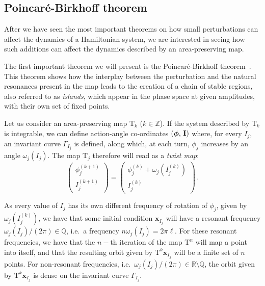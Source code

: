 \subsection{Poincaré-Birkhoff theorem}

After we have seen the most important theorems on how small perturbations can affect the dynamics of a Hamiltonian system, we are interested in seeing how such additions can affect the dynamics described by an area-preserving map.

The first important theorem we will present is the Poincaré-Birkhoff theorem~\cite{poincare, birkhoff}. This theorem shows how the interplay between the perturbation and the natural resonances present in the map leads to the creation of a chain of stable regions, also referred to as \textit{islands}, which appear in the phase space at given amplitudes, with their own set of fixed points.

Let us consider an area-preserving map $\mathrm{T}_k$ ($k\in\mathbb{Z}$). If the system described by $\mathrm{T}_k$ is integrable, we can define action-angle co-ordinates $(\boldsymbol{\phi},\,\vb{I})$ where, for every $I_j$, an invariant curve $\Gamma_{I_j}$ is defined, along which, at each turn, $\phi_j$ increases by an angle $\omega_j(I_j)$. The map $\mathrm{T}_j$ therefore will read as a \textit{twist map}:
%
\begingroup
\renewcommand*{\arraystretch}{1.5}
\begin{equation}
	\begin{pmatrix} {\phi}^{(k+1)}_j \\ {I}^{(k+1)}_j \end{pmatrix}  = \begin{pmatrix} {\phi}^{(k)}_j + {\omega}_j\left({I}^{(k)}_j\right) \\ {I}^{(k)}_j \end{pmatrix} \, .
\end{equation}
\endgroup

As every value of ${I}_j$ has its own different frequency of rotation of ${\phi}_j$, given by ${\omega}_j({I}^{(k)}_j)$, we have that some initial condition $\mathbf{x}_{I_j}$ will have a resonant frequency ${\omega}_j({I}_j)/(2\pi)\in \mathbb{Q}$, i.e.\ a frequency $n\omega_j(I_j)=2\pi \ell$. For these resonant frequencies, we have that the $n-$th iteration of the map $\mathrm{T}^n$ will map a point into itself, and that the resulting orbit given by $\mathrm{T}^k \mathbf{x}_{I_j}$ will be a finite set of $n$ points. For non-resonant frequencies, i.e.\ $\omega_j(I_j)/(2\pi) \in \mathbb{R}\setminus \mathbb{Q}$, the orbit given by $\mathrm{T}^k \mathbf{x}_{I_j}$ is dense on the invariant curve $\Gamma_{I_j}$.

